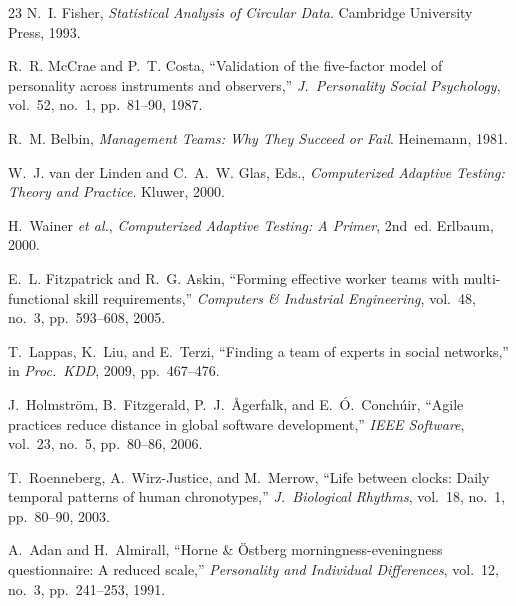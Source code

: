 \documentclass[conference]{IEEEtran}
\begin{document}
\begin{thebibliography}{23}
N.~I. Fisher, \textit{Statistical Analysis of Circular Data}.
Cambridge University Press, 1993.

R.~R. McCrae and P.~T. Costa, ``Validation of the five-factor model
of personality across instruments and observers,'' \textit{J.\
Personality Social Psychology}, vol.~52, no.~1, pp.~81--90, 1987.

R.~M. Belbin, \textit{Management Teams: Why They Succeed or Fail}.
Heinemann, 1981.

W.~J. van der Linden and C.~A.~W. Glas, Eds., \textit{Computerized
Adaptive Testing: Theory and Practice}. Kluwer, 2000.

H.~Wainer \textit{et al.}, \textit{Computerized Adaptive Testing: A
Primer}, 2nd~ed. Erlbaum, 2000.

E.~L. Fitzpatrick and R.~G. Askin, ``Forming effective worker teams
with multi-functional skill requirements,'' \textit{Computers \&
Industrial Engineering}, vol.~48, no.~3, pp.~593--608, 2005.

T.~Lappas, K.~Liu, and E.~Terzi, ``Finding a team of experts in
social networks,'' in \textit{Proc.\ KDD}, 2009, pp.~467--476.

J.~Holmstr\"{o}m, B.~Fitzgerald, P.~J.~\r{A}gerfalk, and
E.~\'{O}.~Conch\'{u}ir, ``Agile practices reduce distance in global
software development,'' \textit{IEEE Software}, vol.~23, no.~5,
pp.~80--86, 2006.

T.~Roenneberg, A.~Wirz-Justice, and M.~Merrow, ``Life between
clocks: Daily temporal patterns of human chronotypes,'' \textit{J.\
Biological Rhythms}, vol.~18, no.~1, pp.~80--90, 2003.

A.~Adan and H.~Almirall, ``Horne \& \"{O}stberg
morningness-eveningness questionnaire: A reduced scale,''
\textit{Personality and Individual Differences}, vol.~12, no.~3,
pp.~241--253, 1991.

\end{thebibliography}
\end{document}
